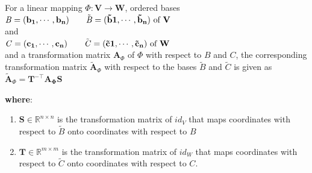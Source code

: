 \begin{theorem}\label{theorem: Basis Change}
    For a linear mapping $\Phi : \mathbf{V \to W}$, ordered bases\\ 
    \(
        \mathit{B} = \mathbf{(b_1, \cdots , b_n)} \quad\quad \tilde{\mathit{B}} = \mathbf{( \tilde{b}1, \cdots , \tilde{b}_n)}  \hfill \text{ of }\mathbf{V}
    \)\\
    and\\
    \(
        \mathit{C} = \mathbf{(c_1, \cdots , c_n)} \quad\quad \tilde{\mathit{C}} = \mathbf{( \tilde{c}1, \cdots , \tilde{c}_n)}  \hfill \text{ of }\mathbf{W}
    \)\\
    and a transformation matrix $\mathbf{A}_\Phi$ of $\Phi$ with respect to $\mathit{B}$ and $\mathit{C}$, the corresponding transformation matrix $\tilde{\mathbf{A}}_\Phi$ with respect to the bases $\tilde{\mathit{B}}$ and $\tilde{\mathit{C}}$ is given as\\
    \( \tilde{\mathbf{A}}_\Phi = \mathbf{T^{-\top} \mathbf{A}_\Phi S} \)
\end{theorem}

\vspace{0.2cm}
\noindent \textbf{where}:
\begin{enumerate}
    \item $\mathbf{S} \in \mathbb{R}^{n\times n}$ is the transformation matrix of $id_V$ that maps coordinates with respect to $\tilde{\mathit{B}}$ onto coordinates with respect to $\mathit{B}$

    \item $\mathbf{T} \in \mathbb{R}^{m\times m}$ is the transformation matrix of $id_W$ that maps coordinates with respect to $\tilde{\mathit{C}}$ onto coordinates with respect to $\mathit{C}$.
\end{enumerate}

